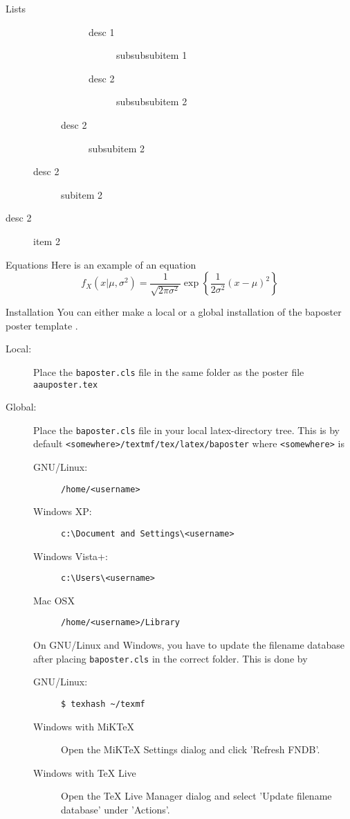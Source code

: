\documentclass[a0paper,portrait]{baposter}
\begin{document}
\begin{poster}
\begin{posterbox}[name=lists,column=0,below=usage]{Lists}
\begin{description}
\begin{description}
\begin{description}
\begin{description}
              \item[desc 1] subsubsubitem 1
              \item[desc 2] subsubsubitem 2
            \end{description}
          \item[desc 2] subsubitem 2
        \end{description}
      \item[desc 2] subitem 2
    \end{description}
  \item[desc 2] item 2
\end{description}
\end{posterbox}

\begin{posterbox}[name=equation,column=0,below=lists,above=bottom]{Equations}
Here is an example of an equation
\begin{equation}
  f_X(x|\mu,\sigma^2) = \frac{1}{\sqrt{2\pi\sigma^2}}\exp\left\{\frac{1}{2\sigma^2}(x-\mu)^2\right\}
\end{equation}
\end{posterbox}

\begin{posterbox}[name=install,span=2,column=1,row=0]{Installation}
You can either make a local or a global installation of the baposter poster template \cite{baposter}.
\begin{description}
  \item[Local:] Place the {\tt baposter.cls} file in the same folder as the poster file {\tt aauposter.tex}
  \item[Global:] Place the {\tt baposter.cls} file in your local latex-directory tree. This is by default {\tt <somewhere>/textmf/tex/latex/baposter} where {\tt <somewhere>} is
  \begin{description}
    \item[GNU/Linux:] {\tt/home/<username>}
    \item[Windows XP:] {\tt c:\textbackslash Document and Settings\textbackslash<username>}
    \item[Windows Vista+:] {\tt c:\textbackslash Users\textbackslash<username>}
    \item[Mac OSX] {\tt/home/<username>/Library}
  \end{description}
  On GNU/Linux and Windows, you have to update the filename database after placing {\tt baposter.cls} in the correct folder. This is done by
  \begin{description}
    \item[GNU/Linux:] {\tt \$ texhash \textasciitilde /texmf}
    \item[Windows with MiKTeX] Open the MiKTeX Settings dialog and click 'Refresh FNDB'.
    \item[Windows with TeX Live] Open the TeX Live Manager dialog and select 'Update filename database' under 'Actions'.
  \end{description}
\end{description}
\end{posterbox}


\end{poster}
\end{document}
